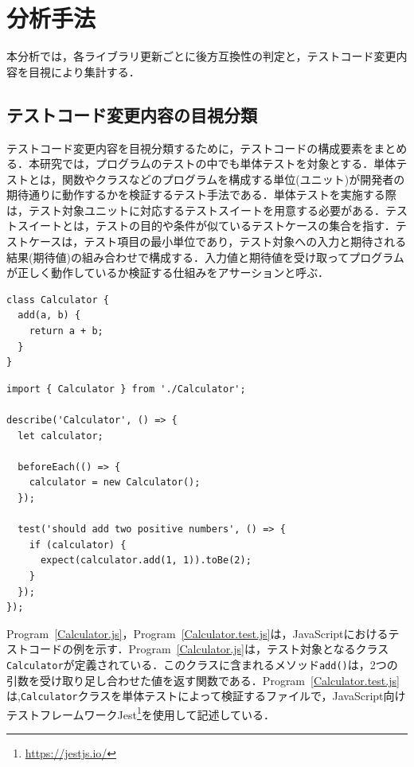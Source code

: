 \documentclass[11pt,dvipdfmx]{jreport}
\begin{document}
\section{分析手法}
本分析では，各ライブラリ更新ごとに後方互換性の判定と，テストコード変更内容を目視により集計する．

\subsection{テストコード変更内容の目視分類}
テストコード変更内容を目視分類するために，テストコードの構成要素をまとめる．本研究では，プログラムのテストの中でも単体テストを対象とする．単体テストとは，関数やクラスなどのプログラムを構成する単位(ユニット)が開発者の期待通りに動作するかを検証するテスト手法である．単体テストを実施する際は，テスト対象ユニットに対応するテストスイートを用意する必要がある．テストスイートとは，テストの目的や条件が似ているテストケースの集合を指す．テストケースは，テスト項目の最小単位であり，テスト対象への入力と期待される結果(期待値)の組み合わせで構成する．入力値と期待値を受け取ってプログラムが正しく動作しているか検証する仕組みをアサーションと呼ぶ．

\begin{lstlisting}[caption=Calculator.js, label=Calculator.js]
class Calculator {
  add(a, b) {
    return a + b;
  }
}
\end{lstlisting}

\begin{lstlisting}[caption=Calculator.test.js, label=Calculator.test.js]
import { Calculator } from './Calculator';

describe('Calculator', () => {
  let calculator;

  beforeEach(() => {
    calculator = new Calculator();
  });

  test('should add two positive numbers', () => {
    if (calculator) {
      expect(calculator.add(1, 1)).toBe(2);
    }
  });
});
\end{lstlisting}


Program~\ref{Calculator.js}，Program~\ref{Calculator.test.js}は，JavaScriptにおけるテストコードの例を示す．Program~\ref{Calculator.js}は，テスト対象となるクラス{\verb|Calculator|}が定義されている．このクラスに含まれるメソッド{\verb|add()|}は，2つの引数を受け取り足し合わせた値を返す関数である．Program~\ref{Calculator.test.js}は,{\verb|Calculator|}クラスを単体テストによって検証するファイルで，JavaScript向けテストフレームワークJest\footnote{\url{https://jestjs.io/}}を使用して記述している．
\end{document}
